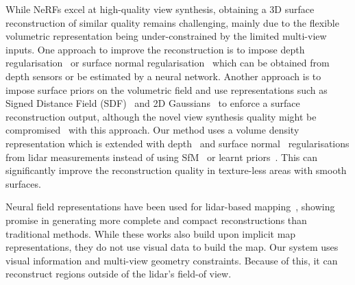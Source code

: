 
While NeRFs excel at high-quality view synthesis, obtaining a 3D surface reconstruction of similar quality remains challenging, mainly due to the flexible volumetric representation being under-constrained by the limited multi-view inputs. One approach to improve the reconstruction is to impose depth regularisation~\cite{deng2022depth, rematas2022urban} or surface normal regularisation~\cite{Yu2022MonoSDF} which can be obtained from depth sensors or be estimated by a neural network.
Another approach is to impose surface priors on the volumetric field and use 
representations such as Signed Distance Field (SDF)~\cite{neuralangelo,yariv2021volume} and 2D Gaussians~\cite{huang20242dgs} to enforce a surface reconstruction output, although the novel view synthesis quality might be compromised~\cite{wang2021neus} with this approach. 
Our method uses a volume density representation which is extended with depth~\cite{deng2022depth} and surface normal~\cite{Yu2022MonoSDF} regularisations from lidar measurements instead of using SfM~\cite{deng2022depth} or learnt priors~\cite{Yu2022MonoSDF}. This can significantly improve the reconstruction quality in texture-less areas with smooth surfaces.


Neural field representations have been used for lidar-based mapping~\cite{zhong2023icra,deng2023nerfloam,pan2024pinslam}, showing promise in generating more complete and compact reconstructions than traditional methods. While these works also build upon implicit map representations, they do not use visual data to build the map. Our system uses visual information and multi-view geometry constraints. Because of this, it can reconstruct regions outside of the lidar's field-of view.

